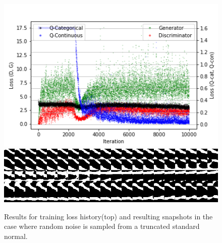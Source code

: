 \documentclass{article}
\begin{document}
\begin{figure}[h]
\centering
\includegraphics[width=\textwidth,scale=0.2]{figures/SampleTruncNorm.png}
\includegraphics[width=\textwidth,scale=0.2]{figures/Sample_TruncNorm.png}
  \caption{Results for training loss history(top) and resulting snapshots in the case where random noise is sampled from a truncated standard normal.  }
\end{figure}\label{tnorm}
\end{document}
